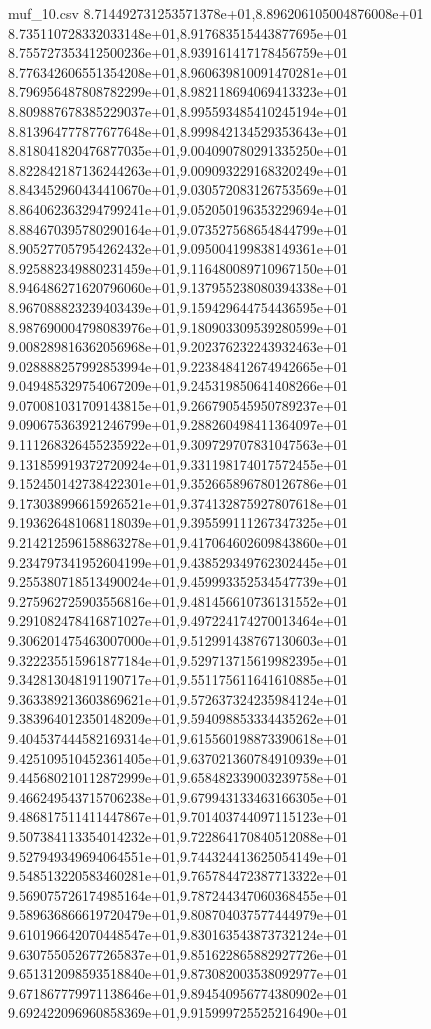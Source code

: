 \begin{filecontents*}{muf_10.csv}
8.714492731253571378e+01,8.896206105004876008e+01
8.735110728332033148e+01,8.917683515443877695e+01
8.755727353412500236e+01,8.939161417178456759e+01
8.776342606551354208e+01,8.960639810091470281e+01
8.796956487808782299e+01,8.982118694069413323e+01
8.809887678385229037e+01,8.995593485410245194e+01
8.813964777877677648e+01,8.999842134529353643e+01
8.818041820476877035e+01,9.004090780291335250e+01
8.822842187136244263e+01,9.009093229168320249e+01
8.843452960434410670e+01,9.030572083126753569e+01
8.864062363294799241e+01,9.052050196353229694e+01
8.884670395780290164e+01,9.073527568654844799e+01
8.905277057954262432e+01,9.095004199838149361e+01
8.925882349880231459e+01,9.116480089710967150e+01
8.946486271620796060e+01,9.137955238080394338e+01
8.967088823239403439e+01,9.159429644754436595e+01
8.987690004798083976e+01,9.180903309539280599e+01
9.008289816362056968e+01,9.202376232243932463e+01
9.028888257992853994e+01,9.223848412674942665e+01
9.049485329754067209e+01,9.245319850641408266e+01
9.070081031709143815e+01,9.266790545950789237e+01
9.090675363921246799e+01,9.288260498411364097e+01
9.111268326455235922e+01,9.309729707831047563e+01
9.131859919372720924e+01,9.331198174017572455e+01
9.152450142738422301e+01,9.352665896780126786e+01
9.173038996615926521e+01,9.374132875927807618e+01
9.193626481068118039e+01,9.395599111267347325e+01
9.214212596158863278e+01,9.417064602609843860e+01
9.234797341952604199e+01,9.438529349762302445e+01
9.255380718513490024e+01,9.459993352534547739e+01
9.275962725903556816e+01,9.481456610736131552e+01
9.291082478416871027e+01,9.497224174270013464e+01
9.306201475463007000e+01,9.512991438767130603e+01
9.322235515961877184e+01,9.529713715619982395e+01
9.342813048191190717e+01,9.551175611641610885e+01
9.363389213603869621e+01,9.572637324235984124e+01
9.383964012350148209e+01,9.594098853334435262e+01
9.404537444582169314e+01,9.615560198873390618e+01
9.425109510452361405e+01,9.637021360784910939e+01
9.445680210112872999e+01,9.658482339003239758e+01
9.466249543715706238e+01,9.679943133463166305e+01
9.486817511411447867e+01,9.701403744097115123e+01
9.507384113354014232e+01,9.722864170840512088e+01
9.527949349694064551e+01,9.744324413625054149e+01
9.548513220583460281e+01,9.765784472387713322e+01
9.569075726174985164e+01,9.787244347060368455e+01
9.589636866619720479e+01,9.808704037577444979e+01
9.610196642070448547e+01,9.830163543873732124e+01
9.630755052677265837e+01,9.851622865882927726e+01
9.651312098593518840e+01,9.873082003538092977e+01
9.671867779971138646e+01,9.894540956774380902e+01
9.692422096960858369e+01,9.915999725525216490e+01

\end{filecontents*}
